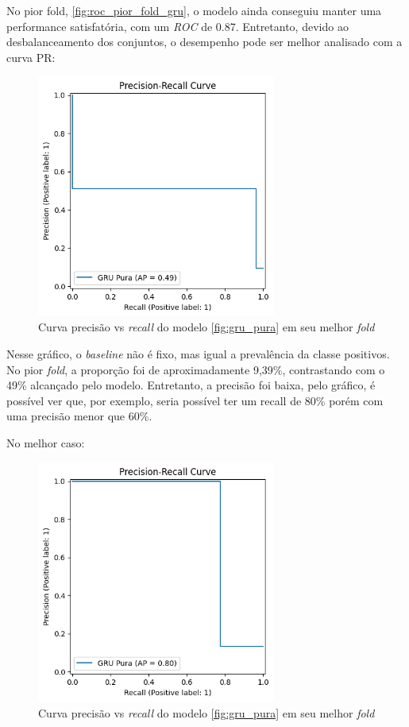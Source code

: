 \documentclass[
    12pt,                %
    openright,           %
    oneside,             %
    a4paper,             %
    brazil               %
]{abntex2}
\begin{document}
No pior fold, \ref{fig:roc_pior_fold_gru}, o modelo ainda conseguiu manter uma performance satisfatória, com um \textit{ROC} de 0.87. 
Entretanto, devido ao desbalanceamento dos conjuntos, o desempenho pode ser melhor analisado com a curva PR:

\begin{figure}[H]
  \centering
   \includegraphics[width=0.7\textwidth]{figuras/modelos_resultados/ap_gru_pior_fold.png} %
  \caption{Curva precisão vs \textit{recall} do modelo \ref{fig:gru_pura} em seu melhor \textit{fold}}
  \label{fig:ap_gru_pior_fold}
\end{figure}

Nesse gráfico, o \textit{baseline} não é fixo, mas igual a prevalência da classe positivos. No pior \textit{fold}, a proporção foi de aproximadamente
9,39\%, contrastando com o 49\% alcançado pelo modelo. Entretanto, a precisão foi baixa, pelo gráfico, é possível ver que, por exemplo, seria 
possível ter um recall de 80\% porém com uma precisão menor que 60\%.

No melhor caso:

\begin{figure}[H]
  \centering
   \includegraphics[width=0.7\textwidth]{figuras/modelos_resultados/ap_gru_melhor_fold.png} %
  \caption{Curva precisão vs \textit{recall} do modelo \ref{fig:gru_pura} em seu melhor \textit{fold}}
  \label{fig:ap_gru_melhor_fold}
\end{figure}
\end{document}
